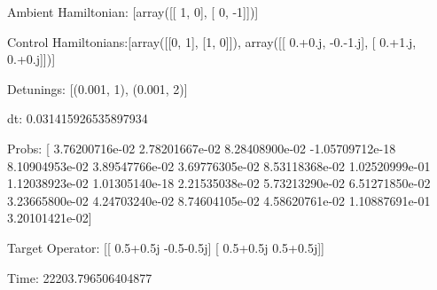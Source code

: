 \documentclass{article}
\begin{document}
    

\newpage

Ambient Hamiltonian: [array([[ 1,  0],
       [ 0, -1]])]

Control Hamiltonians:[array([[0, 1],
       [1, 0]]), array([[ 0.+0.j, -0.-1.j],
       [ 0.+1.j,  0.+0.j]])]

Detunings: [(0.001, 1), (0.001, 2)]

 dt: 0.031415926535897934

Probs: [  3.76200716e-02   2.78201667e-02   8.28408900e-02  -1.05709712e-18
   8.10904953e-02   3.89547766e-02   3.69776305e-02   8.53118368e-02
   1.02520999e-01   1.12038923e-02   1.01305140e-18   2.21535038e-02
   5.73213290e-02   6.51271850e-02   3.23665800e-02   4.24703240e-02
   8.74604105e-02   4.58620761e-02   1.10887691e-01   3.20101421e-02]

Target Operator: [[ 0.5+0.5j -0.5-0.5j]
 [ 0.5+0.5j  0.5+0.5j]]

Time: 22203.796506404877
\end{document}
